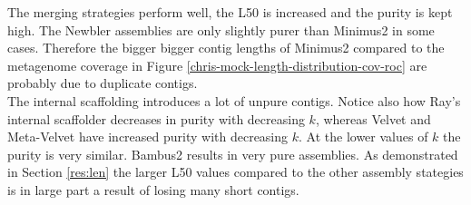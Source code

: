 \documentclass[a4paper,12pt]{report}
\begin{document}
The merging strategies perform well, the L50 is increased and the purity is
kept high. The Newbler assemblies are only slightly purer than Minimus2 in some
cases. Therefore the bigger bigger contig lengths of Minimus2 compared to the
metagenome coverage in Figure \ref{chris-mock-length-distribution-cov-roc} are
probably due to duplicate contigs.\\


The internal scaffolding introduces a lot of unpure contigs. Notice also how
Ray's internal scaffolder decreases in purity with decreasing $k$, whereas
Velvet and Meta-Velvet have increased purity with decreasing $k$. At the lower
values of $k$ the purity is very similar. Bambus2 results in very pure
assemblies. As demonstrated in Section \ref{res:len} the larger L50 values
compared to the other assembly stategies is in large part a result of losing
many short contigs.\\
\end{document}
